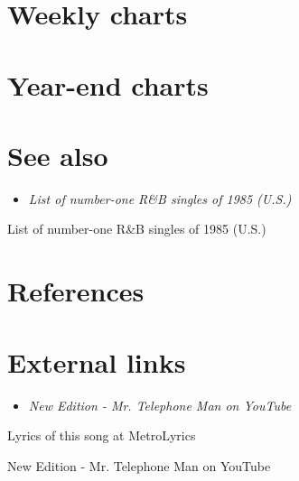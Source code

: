 \section{Weekly charts}\label{weekly-charts}

\section{Year-end charts}\label{year-end-charts}

\section{See also}\label{see-also}

\begin{itemize}
\item
  \emph{List of number-one R\&B singles of 1985 (U.S.)}
\end{itemize}

List of number-one R\&B singles of 1985 (U.S.)

\section{References}\label{references}

\section{External links}\label{external-links}

\begin{itemize}
\item
  \emph{New Edition - Mr. Telephone Man on YouTube}
\end{itemize}

Lyrics of this song at MetroLyrics

New Edition - Mr. Telephone Man on YouTube
